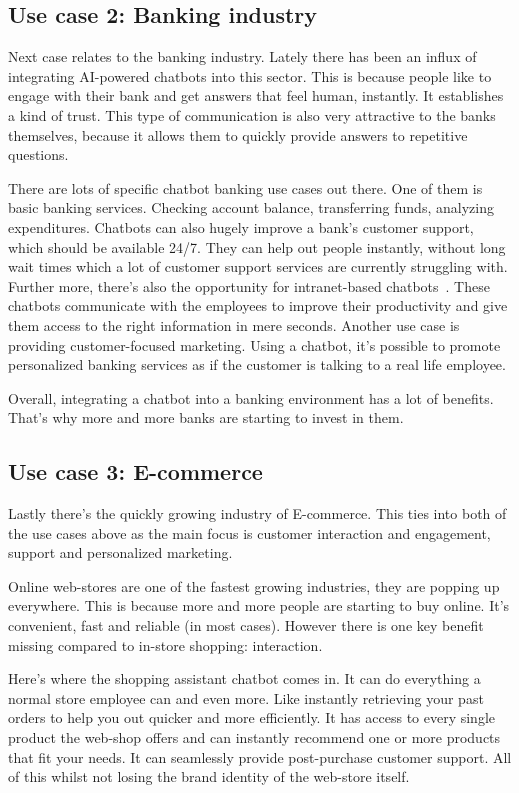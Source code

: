 \subsection{Use case 2: Banking industry}

Next case relates to the banking industry. Lately there has been an influx of integrating AI-powered chatbots into this sector. This is because people like to engage with their bank and get answers that feel human, instantly. It establishes a kind of trust. This type of communication is also very attractive to the banks themselves, because it allows them to quickly provide answers to repetitive questions.

There are lots of specific chatbot banking use cases out there. One of them is basic banking services. Checking account balance, transferring funds, analyzing expenditures. Chatbots can also hugely improve a bank's customer support, which should be available 24/7. They can help out people instantly, without long wait times which a lot of customer support services are currently struggling with. Further more, there's also the opportunity for intranet-based chatbots~\cite{intranet-chabot}. These chatbots communicate with the employees to improve their productivity and give them access to the right information in mere seconds. Another use case is providing customer-focused marketing. Using a chatbot, it's possible to promote personalized banking services as if the customer is talking to a real life employee.

Overall, integrating a chatbot into a banking environment has a lot of benefits. That's why more and more banks are starting to invest in them.

\subsection{Use case 3: E-commerce}

Lastly there's the quickly growing industry of E-commerce. This ties into both of the use cases above as the main focus is customer interaction and engagement, support and personalized marketing.

Online web-stores are one of the fastest growing industries, they are popping up everywhere. This is because more and more people are starting to buy online. It's convenient, fast and reliable (in most cases). However there is one key benefit missing compared to in-store shopping: interaction.

Here's where the shopping assistant chatbot comes in. It can do everything a normal store employee can and even more. Like instantly retrieving your past orders to help you out quicker and more efficiently. It has access to every single product the web-shop offers and can instantly recommend one or more products that fit your needs. It can seamlessly provide post-purchase customer support. All of this whilst not losing the brand identity of the web-store itself.

